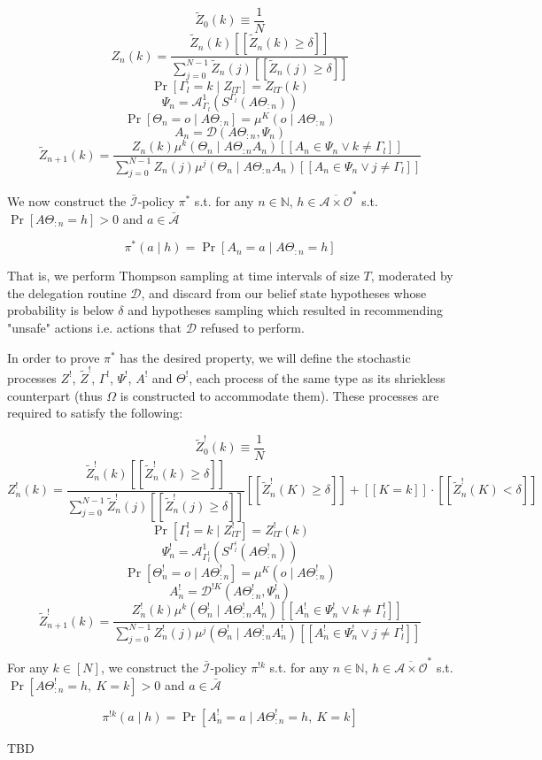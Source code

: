 \documentclass[a4paper]{article}
\newcommand{\Nats}{\mathbb{N}}
\newcommand{\Ob}{\mathcal{O}}
\newcommand{\A}{\mathcal{A}}
\newcommand{\In}{\mathcal{I}}
\newcommand{\Ada}{\bar{\A}}
\newcommand{\Adi}{{\bar{\In}}}
\newcommand{\Adao}{\overline{\A \times \Ob}}
\newcommand{\Adfh}{\Adao^*}
\newcommand{\D}{\mathcal{D}}
\newcommand{\Z}{Z}
\begin{document}
$$\tilde{\Z}_0(k)\equiv\frac{1}{N}$$
%
$$\Z_{n}(k) = \frac{\tilde{\Z}_{n}(k)[[\tilde{\Z}_{n}(k) \geq \delta]] }{\sum_{j = 0}^{N-1}\tilde{\Z}_{n}(j)[[\tilde{\Z}_{n}(j) \geq \delta]]}$$
%
$$\Pr\left[\Gamma_{l} = k \mid Z_{lT}\right] = \Z_{lT}\left(k\right)$$
%
$$\Psi_{n} = \A^1_{\Gamma_l}\left(S^{\Gamma_l}(A\Theta_{:n})\right)$$
%
$$\Pr\left[\Theta_{n} = o \mid A\Theta_{:n}\right] = \mu^K\left(o \mid A\Theta_{:n}\right)$$
%
$$A_n = \D\left(A\Theta_{:n}, \Psi_n\right)$$
%
$$\tilde{\Z}_{n+1}(k)=\frac{\Z_{n}(k) \mu^k\left(\Theta_{n} \mid A\Theta_{:n}A_{n}\right)[[A_{n} \in \Psi_{n} \lor k \ne \Gamma_l]]}{\sum_{j = 0}^{N-1} \Z_n(j) \mu^j(\Theta_n \mid A\Theta_{:n}A_n)[[A_{n} \in \Psi_{n} \lor j \ne \Gamma_l]]}$$

We now construct the $\Adi$-policy $\pi^*$ s.t. for any $n \in \Nats$, $h \in \Adfh$ s.t. $\Pr\left[A\Theta_{:n}=h\right] > 0$ and $a \in \Ada$

$$\pi^*(a \mid h)=\Pr\left[A_n = a \mid A\Theta_{:n} = h\right]$$

That is, we perform Thompson sampling at time intervals of size $T$, moderated by the delegation routine $\D$, and discard from our belief state hypotheses whose probability is below $\delta$ and hypotheses sampling which resulted in recommending "unsafe" actions i.e. actions that $\D$ refused to perform.

In order to prove $\pi^*$ has the desired property, we will define the stochastic processes $\Z^!$, $\tilde{\Z}^!$, $\Gamma^!$, $\Psi^!$, $A^!$ and $\Theta^!$, each process of the same type as its shriekless counterpart (thus $\Omega$ is constructed to accommodate them). These processes are required to satisfy the following:

$$\tilde{\Z}^!_0(k)\equiv\frac{1}{N}$$
%
$$\Z_{n}^!(k) = \frac{\tilde{\Z}^!_{n}(k)[[\tilde{\Z}^!_{n}(k) \geq \delta]] }{\sum_{j = 0}^{N-1}\tilde{\Z}^!_{n}(j)[[\tilde{\Z}^!_{n}(j) \geq \delta]]}[[\tilde{\Z}^!_{n}(K) \geq \delta]] + [[K = k]]\cdot [[\tilde{\Z}^!_{n}(K) < \delta]]$$
%
$$\Pr\left[\Gamma^!_{l} = k \mid Z^!_{lT}\right] = \Z^!_{lT}\left(k\right)$$
%
$$\Psi^!_{n} = \A^1_{\Gamma^!_l}\left(S^{\Gamma^!_l}(A\Theta^!_{:n})\right)$$
%
$$\Pr\left[\Theta^!_{n} = o \mid A\Theta^!_{:n}\right] = \mu^K\left(o \mid A\Theta^!_{:n}\right)$$
%
$$A^!_n = \D^{!K}\left(A\Theta^!_{:n}, \Psi^!_n\right)$$
%
$$\tilde{\Z}^!_{n+1}(k)=\frac{\Z^!_{n}(k) \mu^k\left(\Theta^!_{n} \mid A\Theta^!_{:n}A_{n}^!\right)[[A^!_{n} \in \Psi^!_{n} \lor k \ne \Gamma^!_l]]}{\sum_{j = 0}^{N-1} \Z^!_n(j) \mu^j(\Theta^!_n \mid A\Theta^!_{:n}A^!_n)[[A^!_{n} \in \Psi^!_{n} \lor j \ne \Gamma^!_l]]}$$

For any $k \in [N]$, we construct the $\Adi$-policy $\pi^{!k}$ s.t. for any $n \in \Nats$, $h \in \Adfh$ s.t. $\Pr\left[A\Theta^!_{:n}=h,\ K = k\right] > 0$ and $a \in \Ada$

$$\pi^{!k}(a \mid h)=\Pr\left[A^!_n = a \mid A\Theta^!_{:n} = h,\ K = k\right]$$

TBD
\end{document}
